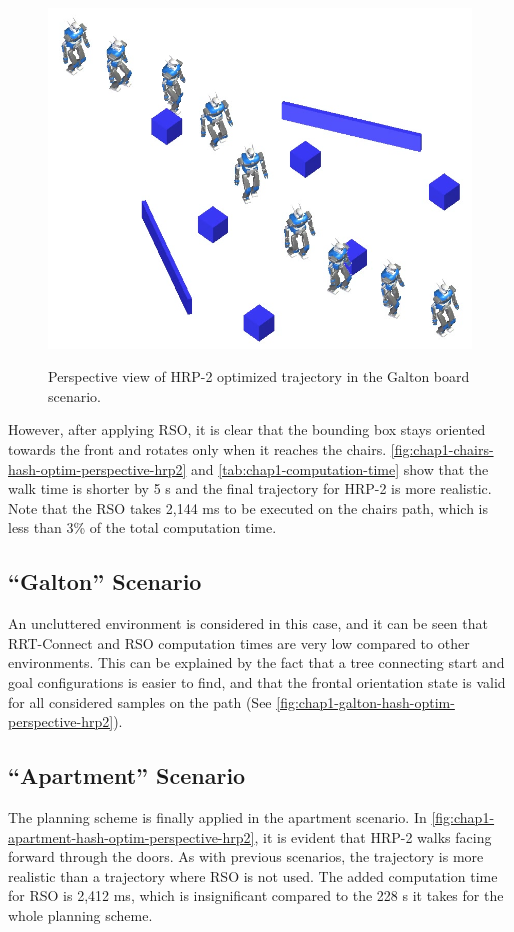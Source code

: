 \begin{figure}
  \centering
      {\includegraphics[width = \linewidth]
        {src/chap1-path-optimization/galton-hash-optim-perspective-hrp2.png}}
      \caption{Perspective view of HRP-2 optimized trajectory in the
        Galton board scenario.}
      \label{fig:chap1-galton-hash-optim-perspective-hrp2}
\end{figure}

However, after applying RSO, it is clear that the bounding box stays
oriented towards the front and rotates only when it reaches the
chairs. \autoref{fig:chap1-chairs-hash-optim-perspective-hrp2} and
\autoref{tab:chap1-computation-time} show that the walk time is shorter by 5
s and the final trajectory for HRP-2 is more realistic. Note that the
RSO takes 2,144 ms to be executed on the chairs path, which is less
than 3\% of the total computation time.

\subsection{``Galton'' Scenario}
An uncluttered environment is considered in this case, and
it can be seen that RRT-Connect and RSO computation times are very low
compared to other environments. This can be explained by the fact that
a tree connecting start and goal configurations is easier to find, and
that the frontal orientation state is valid for all considered samples
on the path (See \autoref{fig:chap1-galton-hash-optim-perspective-hrp2}).

\subsection{``Apartment'' Scenario}
The planning scheme is finally applied in the apartment
scenario. In \autoref{fig:chap1-apartment-hash-optim-perspective-hrp2}, it
is evident that HRP-2 walks facing forward through the doors. As with
previous scenarios, the trajectory is more realistic than a trajectory
where RSO is not used. The added computation time for RSO is 2,412 ms,
which is insignificant compared to the 228 s it takes for the whole
planning scheme.

